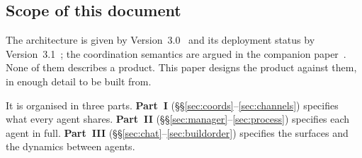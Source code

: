 \documentclass[11pt]{article}
\begin{document}
\subsection{Scope of this document}

The architecture is given by Version~3.0~\citep{yang2026hierarchical} and its deployment status by Version~3.1~\citep{yang2026v31}; the coordination semantics are argued in the companion paper~\citep{yang2026manager}. None of them describes a product. This paper designs the product against them, in enough detail to be built from.

It is organised in three parts. \textbf{Part~I} (\S\S\ref{sec:coords}--\ref{sec:channels}) specifies what every agent shares. \textbf{Part~II} (\S\S\ref{sec:manager}--\ref{sec:process}) specifies each agent in full. \textbf{Part~III} (\S\S\ref{sec:chat}--\ref{sec:buildorder}) specifies the surfaces and the dynamics between agents.
\end{document}

